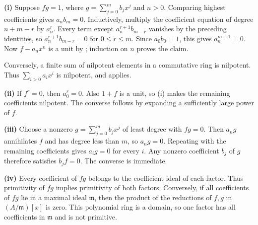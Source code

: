 \textbf{(i)} Suppose $fg=1$, where $g=\sum_{j=0}^m b_jx^j$ and $n>0$. Comparing highest coefficients gives $a_nb_m=0$. Inductively, multiply the coefficient equation of degree $n+m-r$ by $a_n^r$. Every term except $a_n^{r+1}b_{m-r}$ vanishes by the preceding identities, so $a_n^{r+1}b_{m-r}=0$ for $0\leq r\leq m$. Since $a_0b_0=1$, this gives $a_n^{m+1}=0$. Now $f-a_nx^n$ is a unit by ; induction on $n$ proves the claim.

Conversely, a finite sum of nilpotent elements in a commutative ring is nilpotent. Thus $\sum_{i>0}a_ix^i$ is nilpotent, and  applies.

\textbf{(ii)} If $f^r=0$, then $a_0^r=0$. Also $1+f$ is a unit, so (i) makes the remaining coefficients nilpotent. The converse follows by expanding a sufficiently large power of $f$.

\textbf{(iii)} Choose a nonzero $g=\sum_{j=0}^m b_jx^j$ of least degree with $fg=0$. Then $a_ng$ annihilates $f$ and has degree less than $m$, so $a_ng=0$. Repeating with the remaining coefficients gives $a_ig=0$ for every $i$. Any nonzero coefficient $b_j$ of $g$ therefore satisfies $b_jf=0$. The converse is immediate.

\textbf{(iv)} Every coefficient of $fg$ belongs to the coefficient ideal of each factor. Thus primitivity of $fg$ implies primitivity of both factors. Conversely, if all coefficients of $fg$ lie in a maximal ideal $\mathfrak m$, then the product of the reductions of $f,g$ in $(A/\mathfrak m)[x]$ is zero. This polynomial ring is a domain, so one factor has all coefficients in $\mathfrak m$ and is not primitive.
